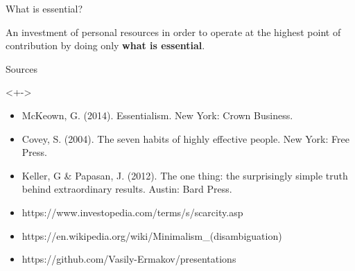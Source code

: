 \documentclass{beamer}
\begin{document}
    \begin{frame}{What is essential?}
        \begin{block}{}
            An investment of personal resources in order to operate at the highest point of contribution by doing only \textbf{what is essential}.
        \end{block}
    \end{frame}

    \begin{frame}{Sources}
        \begin{block}
            <+->{}
            \begin{itemize}
                \item McKeown, G. (2014). Essentialism. New York: Crown Business.
                \item Covey, S. (2004). The seven habits of highly effective people. New York: Free Press.
                \item Keller, G \& Papasan, J. (2012). The one thing: the surprisingly simple truth behind extraordinary results. Austin: Bard Press.
                \item https://www.investopedia.com/terms/s/scarcity.asp
                \item https://en.wikipedia.org/wiki/Minimalism\_(disambiguation)
                \item https://github.com/Vasily-Ermakov/presentations
            \end{itemize}
        \end{block}
    \end{frame}
\end{document}
